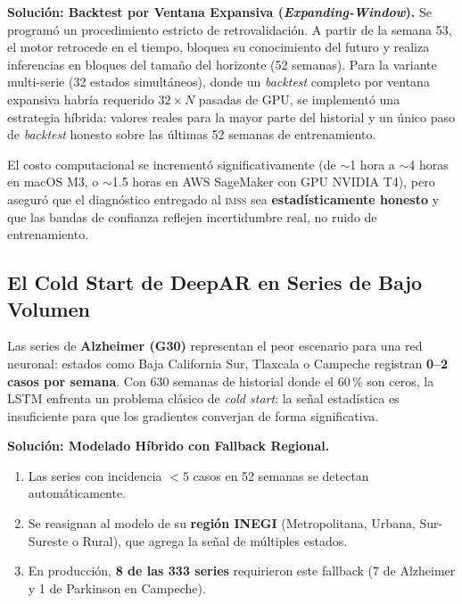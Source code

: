 \documentclass[12pt, letterpaper]{article}
\newcommand{\imss}{\textsc{imss}}
\begin{document}
\textbf{Solución: Backtest por Ventana Expansiva (\textit{Expanding-Window}).} Se programó un procedimiento estricto de retrovalidación. A partir de la semana 53, el motor retrocede en el tiempo, bloquea su conocimiento del futuro y realiza inferencias en bloques del tamaño del horizonte (52 semanas). Para la variante multi-serie (32 estados simultáneos), donde un \textit{backtest} completo por ventana expansiva habría requerido $32 \times N$ pasadas de GPU, se implementó una estrategia híbrida: valores reales para la mayor parte del historial y un único paso de \textit{backtest} honesto sobre las últimas 52 semanas de entrenamiento.

El costo computacional se incrementó significativamente (de $\sim$1 hora a $\sim$4 horas en macOS M3, o $\sim$1.5 horas en AWS SageMaker con GPU NVIDIA T4), pero aseguró que el diagnóstico entregado al \imss{} sea \textbf{estadísticamente honesto} y que las bandas de confianza reflejen incertidumbre real, no ruido de entrenamiento.

\subsection{El Cold Start de DeepAR en Series de Bajo Volumen}\label{subsec:coldstart}

\begin{warningbox}
Las series de \textbf{Alzheimer (G30)} representan el peor escenario para una red neuronal: estados como Baja California Sur, Tlaxcala o Campeche registran \textbf{0--2 casos por semana}. Con 630 semanas de historial donde el 60\,\% son ceros, la LSTM enfrenta un problema clásico de \textit{cold start}: la señal estadística es insuficiente para que los gradientes converjan de forma significativa.
\end{warningbox}

\textbf{Solución: Modelado Híbrido con Fallback Regional.}
\begin{enumerate}[noitemsep]
    \item Las series con incidencia $<5$ casos en 52 semanas se detectan automáticamente.
    \item Se reasignan al modelo de su \textbf{región INEGI} (Metropolitana, Urbana, Sur-Sureste o Rural), que agrega la señal de múltiples estados.
    \item En producción, \textbf{8 de las 333 series} requirieron este fallback (7 de Alzheimer y 1 de Parkinson en Campeche).
\end{enumerate}
\end{document}
